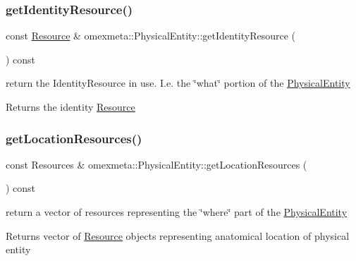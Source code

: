 \subsubsection{\texorpdfstring{get\+Identity\+Resource()}{getIdentityResource()}}
{\footnotesize\ttfamily const \hyperlink{classomexmeta_1_1Resource}{Resource} \& omexmeta\+::\+Physical\+Entity\+::get\+Identity\+Resource (\begin{DoxyParamCaption}{ }\end{DoxyParamCaption}) const}



return the Identity\+Resource in use. I.\+e. the \char`\"{}what\char`\"{} portion of the \hyperlink{classomexmeta_1_1PhysicalEntity}{Physical\+Entity} 

\begin{DoxyReturn}{Returns}
the identity \hyperlink{classomexmeta_1_1Resource}{Resource} 
\end{DoxyReturn}
\mbox{\label{classomexmeta_1_1PhysicalEntity_a3e2fba07a4622db0180650d24bf263d9}} 
\subsubsection{\texorpdfstring{get\+Location\+Resources()}{getLocationResources()}}
{\footnotesize\ttfamily const Resources \& omexmeta\+::\+Physical\+Entity\+::get\+Location\+Resources (\begin{DoxyParamCaption}{ }\end{DoxyParamCaption}) const}



return a vector of resources representing the \char`\"{}where\char`\"{} part of the \hyperlink{classomexmeta_1_1PhysicalEntity}{Physical\+Entity} 

\begin{DoxyReturn}{Returns}
vector of \hyperlink{classomexmeta_1_1Resource}{Resource} objects representing anatomical location of physical entity 
\end{DoxyReturn}
\mbox{\label{classomexmeta_1_1PhysicalEntity_a33559c90dbe3e3be1b71898ab9a5bfa4}} 
